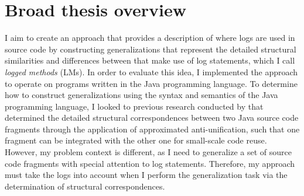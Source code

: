 %
%
%



\section{Broad thesis overview} \label{intro-overview}
I aim to create an approach that provides a description of where logs are used in source code by constructing generalizations that represent the detailed structural similarities and differences between  that make use of log statements, which I call \emph{logged methods} (LMs). In order to evaluate this idea, I implemented the approach to operate on programs written in the Java programming language. To determine how to construct generalizations using the syntax and semantics of the Java programming language, I looked to previous research conducted by \citet{2008:fse:cottrell} that determined the detailed structural correspondences between two Java source code fragments through the application of approximated anti-unification, such that one fragment can be integrated with the other one for small-scale code reuse. However, my problem context is different, as I need to generalize a set of source code fragments with special attention to log statements. Therefore, my approach must take the logs into account when I perform the generalization task via the determination of structural correspondences.


